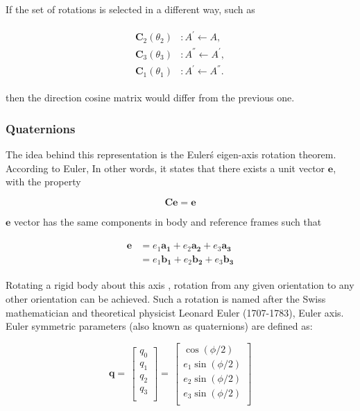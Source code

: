 If the set of rotations is selected in a different way, such as 

\begin{align}
\label{eqn:sequence2}
\begin{split}
{\bm{C}}_2(\theta_{2}) & :      A^{'} \leftarrow A   ,
\\
{\bm{C}}_3(\theta_{3}) & :      A^{''} \leftarrow A^{'}   ,
\\
{\bm{C}}_1(\theta_{1}) & :      A^{'} \leftarrow A^{''}  .
\end{split}
\end{align}

then the direction cosine matrix would differ from the previous one.

\subsubsection{Quaternions}

The idea behind this representation is the Euler\' s eigen-axis rotation theorem. 
According to Euler,  In other words, it states that there 
exists a unit vector $\bm{e}$, with the property

\begin{equation}
\label{eqn:quat1}
\bm{C}\bm{e}= \bm{e}
\end{equation}

$\bm{e}$ vector has the same components in body and reference frames such that

\begin{align}
\label{eqn:quat2}
\begin{split}
\bm{e} & = e_1 \bm{a_1} + e_2 \bm{a_2} + e_3 \bm{a_3}
\\
& = e_1 \bm{b_1} + e_2 \bm{b_2} + e_3 \bm{b_3}
\end{split}
\end{align}
 
Rotating a rigid body about this axis , rotation from any given orientation to 
any other orientation can be achieved. Such a rotation is named after the Swiss 
mathematician and theoretical physicist Leonard Euler (1707-1783), Euler axis.
Euler symmetric parameters (also known as quaternions) are defined as:
 
 \begin{equation}
 \label{eqn:quat3}
\bm{q}
=\,
\begin{bmatrix}
q_0\\[0.3em]
q_1\\[0.3em]
q_2\\[0.3em]
q_3\\[0.3em]
\end{bmatrix}
=\,
\begin{bmatrix}
\cos(\phi/2)\\[0.3em]
e_1 \sin(\phi/2)\\[0.3em]
e_2 \sin(\phi/2)\\[0.3em]
e_3 \sin(\phi/2)\\[0.3em]
\end{bmatrix}
\end{equation}
 
